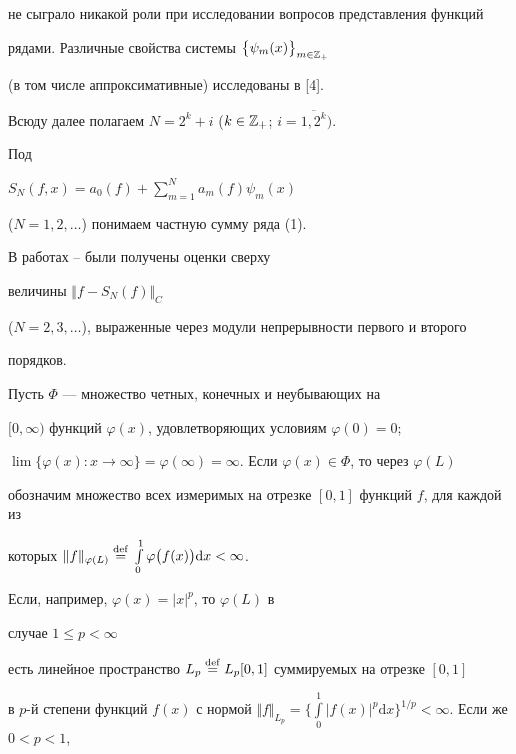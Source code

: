 не сыграло никакой роли при исследовании вопросов представления функций


рядами. Различные свойства системы $\big\{\psi_m(x)\big\}_{m\in \Bbb{Z}_+}$


(в том числе аппроксимативные) исследованы в [4].





Всюду далее полагаем $N=2^k +i$ ($k\in


\Bbb{Z}_+$; $i=\overline{1,2^k})$.





Под


$S_N(f,x)= a_0(f) +\sum\limits_{m=1}^{N} a_m(f)\psi_m(x)$


($N=1,2,\dotsc$) понимаем частную сумму ряда (1).


В работах \cite{4}--\cite{6} были получены оценки сверху


величины $\Vert f-S_N(f)\Vert_C$


($N=2,3,\dotsc$), выраженные через модули непрерывности первого и второго


порядков.





Пусть $\Phi$ --- множество четных, конечных и неубывающих на


$[0,\infty)$ функций $\varphi(x)$, удовлетворяющих условиям $\varphi(0)=0$;


$\lim\big\{ \varphi(x): x\rightarrow \infty\big\} = \varphi(\infty) 


= \infty$. Если $\varphi(x) \in \Phi$, то через $\varphi(L)$


обозначим множество всех измеримых на отрезке $[0,1]$ функций $f$, для каждой из


которых $\Vert f \Vert_{\varphi(L)} \df 


\int\limits_0^1\varphi\big(f(x)\big) \mathrm{d} x < \infty$.


Если, например, $\varphi(x) = |x|^p $, то $\varphi(L)$ в 


случае $1 \leqslant p < \infty$


есть линейное пространство $L_p\overset{\mathrm{def}}{=}{} L_p [0,1]$ суммируемых на отрезке $[0,1]$


в $p$-й степени функций $f(x)$ с нормой $ {\Vert f


\Vert}_{L_p} = \Big\{\int\limits_{0}^{1}| f(x) |^{p}


\mathrm{d} x \Big\}^{1/p} < \infty$. Если же $0 < p < 1$,


